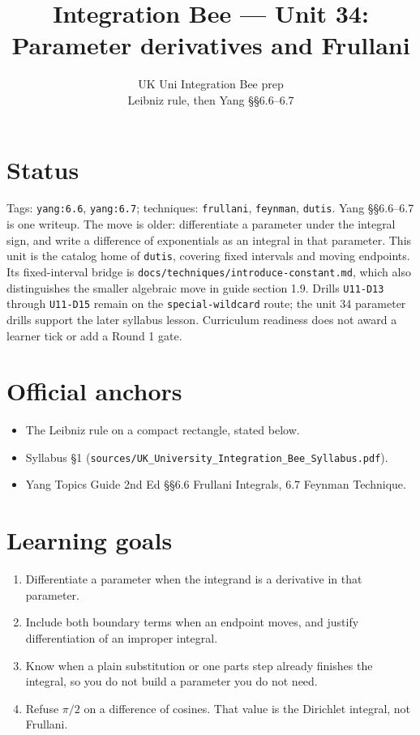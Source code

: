 
\title{Integration Bee --- Unit 34:\\ Parameter derivatives and Frullani}
\author{UK Uni Integration Bee prep\\ Leibniz rule, then Yang \S\S6.6--6.7}
\date{}

\maketitle
\section*{Status}
Tags: \texttt{yang:6.6}, \texttt{yang:6.7}; techniques: \texttt{frullani}, \texttt{feynman}, \texttt{dutis}.
Yang \S\S6.6--6.7 is one writeup. The move is older: differentiate a parameter under the integral sign, and write a difference of exponentials as an integral in that parameter. This unit is the catalog home of \texttt{dutis}, covering fixed intervals and moving endpoints. Its fixed-interval bridge is \texttt{docs/techniques/introduce-constant.md}, which also distinguishes the smaller algebraic move in guide section 1.9. Drills \texttt{U11-D13} through \texttt{U11-D15} remain on the \texttt{special-wildcard} route; the unit 34 parameter drills support the later syllabus lesson. Curriculum readiness does not award a learner tick or add a Round 1 gate.
\section{Official anchors}
\begin{itemize}
\item The Leibniz rule on a compact rectangle, stated below.
\item Syllabus \S1 (\texttt{sources/UK\_University\_Integration\_Bee\_Syllabus.pdf}).
\item Yang Topics Guide 2nd Ed \S\S6.6 Frullani Integrals, 6.7 Feynman Technique.
\end{itemize}
\section{Learning goals}
\begin{enumerate}
  \item Differentiate a parameter when the integrand is a derivative in that parameter.
  \item Include both boundary terms when an endpoint moves, and justify differentiation of an improper integral.
  \item Know when a plain substitution or one parts step already finishes the integral, so you do not build a parameter you do not need.
  \item Refuse $\pi/2$ on a difference of cosines. That value is the Dirichlet integral, not Frullani.
\end{enumerate}

